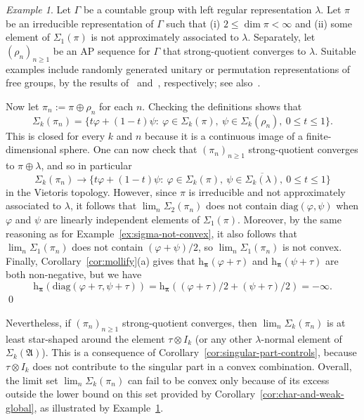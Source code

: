 \documentclass[12pt,a4paper]{article}
\numberwithin{equation}{section}
\theoremstyle{remark}
\newtheorem{ex}[thm]{Example}
\renewcommand{\rm}[1]{\mathrm{#1}}
\newcommand{\rmh}{\mathrm{h}}
\newcommand{\A}{\mathfrak{A}}
\newcommand{\G}{\Gamma}
\renewcommand{\S}{\Sigma}
\renewcommand{\phi}{\varphi}
\renewcommand{\l}{\lambda}
\newcommand{\ol}[1]{\overline{#1}}
\newcommand{\bspi}{\boldsymbol{\pi}}
\begin{document}
\begin{ex}\label{ex:lim-set-not-convex}
Let $\G$ be a countable group with left regular representation $\l$.  Let $\pi$ be an irreducible representation of $\G$ such that (i) $2 \le \dim \pi < \infty$ and (ii) some element of $\S_1(\pi)$ is not approximately associated to $\l$.  Separately, let $(\rho_n)_{n\ge 1}$ be an AP sequence for $\G$ that strong-quotient converges to $\l$.  Suitable examples include randomly generated unitary or permutation representations of free groups, by the results of~\cite{ColMal14} and~\cite{BordCol19}, respectively; see also~\cite{Magee--survey}.

Now let $\pi_n:= \pi\oplus \rho_n$ for each $n$.  Checking the definitions shows that
\[\S_k(\pi_n) = \{t\phi + (1-t)\psi:\ \phi \in \S_k(\pi),\ \psi \in \S_k(\rho_n),\ 0\le t \le 1\}.\]
This is closed for every $k$ and $n$ because it is a continuous image of a finite-dimensional sphere.  One can now check that $(\pi_n)_{n\ge 1}$ strong-quotient converges to $\pi \oplus \l$, and so in particular
\[\S_k(\pi_n) \to \{t\phi + (1-t)\psi:\ \phi \in \S_k(\pi),\ \psi \in \ol{\S_k(\l)},\ 0\le t \le 1\}\]
in the Vietoris topology.  However, since $\pi$ is irreducible and not approximately associated to $\l$, it follows that $\lim_n\S_2(\pi_n)$ does not contain $\rm{diag}(\phi,\psi)$ when $\phi$ and $\psi$ are linearly independent elements of $\S_1(\pi)$.  Moreover, by the same reasoning as for Example~\ref{ex:sigma-not-convex}, it also follows that $\lim_n \S_1(\pi_n)$ does not contain $(\phi + \psi)/2$, so $\lim_n \S_1(\pi_n)$ is not convex.  Finally, Corollary~\ref{cor:mollify}(a) gives that $\rmh_{\bspi}(\phi + \tau)$ and $\rmh_{\bspi}(\psi + \tau)$ are both non-negative, but we have
\[\rmh_{\bspi}(\rm{diag}(\phi + \tau,\psi+\tau)) = \rmh_{\bspi}((\phi + \tau)/2 + (\psi + \tau)/2) = -\infty.\]
\qed
\end{ex}

Nevertheless, if $(\pi_n)_{n\ge 1}$ strong-quotient converges, then $\lim_n \S_k(\pi_n)$ is at least star-shaped around the element $\tau\otimes I_k$ (or any other $\l$-normal element of $\S_k(\A)$).  This is a consequence of Corollary~\ref{cor:singular-part-controls}, because $\tau\otimes I_k$ does not contribute to the singular part in a convex combination.  Overall, the limit set $\lim_n \S_k(\pi_n)$ can fail to be convex only because of its excess outside the lower bound on this set provided by Corollary~\ref{cor:char-and-weak-global}, as illustrated by Example~\ref{ex:lim-set-not-convex}.
\end{document}
